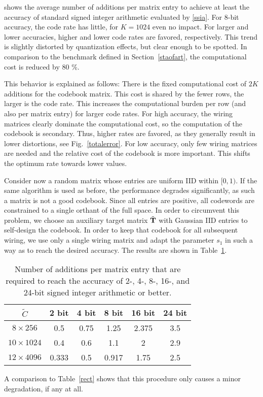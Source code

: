 \documentclass[twocolumn]{IEEEtran}
\begin{document}
shows the average number of additions per matrix entry to achieve at least the accuracy of standard signed integer arithmetic evaluated by \eqref{ssia}. For 8-bit accuracy, the code rate has little, for $K=1024$ even no impact.
For larger and lower accuracies, higher and lower code rates are favored, respectively.  
This trend is slightly distorted by quantization effects, but clear enough to be spotted. In comparison to the benchmark defined in Section~\ref{staofart}, the computational cost is reduced by 80 \%.

This behavior is explained as follows: 
There is the fixed computational cost of $2K$ additions for the codebook matrix. This cost is shared by the fewer rows, the larger is the code rate. This increases the computational burden per row (and also per matrix entry) for larger code rates.
For high accuracy, the wiring matrices clearly dominate the computational cost, so the computation of the codebook is secondary. Thus, higher rates are favored, as they generally result in lower distortions, see Fig.~\ref{totalerror}. For low accuracy, only few wiring matrices are needed and the relative cost of the codebook is more important. This shifts the optimum rate towards lower values.

Consider now a random matrix whose entries are uniform IID within $[0,1)$. If the same algorithm is used as before, the performance degrades significantly, as such a matrix is not a good codebook. Since all entries are positive, all codewords are constrained to a single orthant of the full space.
In order to circumvent this problem, we choose an auxiliary target matrix $\tilde {\mathbf{T}}$ with Gaussian IID entries to self-design the codebook. In order to keep that codebook for all subsequent wiring, we use only a single wiring matrix and adapt the parameter $s_1$ in such a way as to reach the desired accuracy.
The results are shown in Table~\ref{uniform}.
\begin{table}
\begin{center}
\caption{Number of additions per matrix entry that are required to reach the accuracy of 2-, 4-, 8-, 16-, and 24-bit signed integer arithmetic or better.
\label{uniform}}
\begin{tabular}{||c||c|c|c|c|c|}
\hline
$\tilde C$ & 2 bit & 4 bit & 8 bit & 16 bit & 24 bit\\
\hline\hline
$8\times 256$ & 0.5 &0.75 &  1.25 &  2.375 & 3.5  \\
$10 \times 1024$ &0.4  &  0.6 &   1.1 &  2 &  2.9 \\
$12\times 4096$ & 0.333 &0.5 & 0.917&  1.75 & 2.5    \\
\hline
\end{tabular}
\end{center}
\end{table}
A comparison to Table~\ref{rect} shows that this procedure only causes a minor degradation, if any at all.
\end{document}
